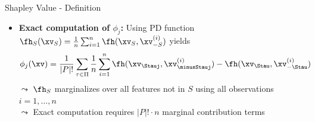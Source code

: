 \documentclass[11pt,compress,t,notes=noshow, aspectratio=169, xcolor=table]{beamer}
\begin{document}
\begin{frame}{Shapley Value - Definition  }
\begin{itemize}
  $\leadsto$ Marginal contributions and Shapley values can be negative
   \item \textbf{Exact computation of $\phi_j$:} Using PD function 
   $\fh_{S}(\xv_S) = \frac{1}{n} \sum_{i=1}^n \fh(\xv_S, \xv_{-S}^{(i)})$ 
   yields
    $$ \phi_j(\xv) = \frac{1}{|P|!} \sum_{\tau \in \Pi} \frac{1}{n} \sum_{i = 1}^n
   \fh(\xv_{\Stauj}, \xv_{\minusStauj}^{(i)}) - \fh(\xv_{\Stau}, \xv_{- \Stau}^{(i)})
   $$
   $\leadsto$ $\fh_S$ marginalizes over all features not in $S$ using all observations $i = 1, \ldots, n$\\
   $\leadsto$ Exact computation requires $|P|! \cdot n$ marginal contribution terms
   
\end{itemize}
\lz

\end{frame}
\end{document}
